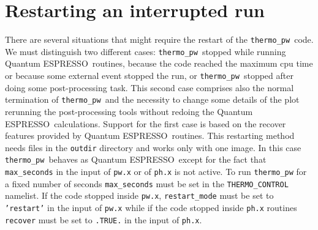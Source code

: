 \documentclass[12pt,a4paper]{article}
\def\qe{{\sc Quantum ESPRESSO}}
\def\thermo{\texttt{thermo\_pw}}
\begin{document}
%
%

\section{\color{coral}Restarting an interrupted run}

There are several situations that might require the restart of the \thermo\ 
code. We must distinguish two different cases:
\thermo\ stopped while running \qe\ routines, because the code reached
the maximum cpu time or because some external event stopped the run,
or \thermo\ stopped after doing some post-processing task. This second 
case comprises also the normal termination of
\thermo\ and the necessity to change some details of the plot rerunning
the post-processing tools without redoing the \qe\ calculations.
Support for the first case is based on the recover features provided by 
\qe\ routines. This restarting method needs files in the \texttt{outdir}
directory and works only with one image. In this case \thermo\ behaves as \qe\ 
except for the fact that \texttt{max\_seconds} in the input of \texttt{pw.x} or
of \texttt{ph.x} is not active. To run \texttt{thermo\_pw}
for a fixed number of seconds \texttt{max\_seconds} must be set in the
\texttt{THERMO\_CONTROL} namelist. If the code stopped inside \texttt{pw.x},
\texttt{restart\_mode} must be set to \texttt{'restart'} in the input of 
\texttt{pw.x} while if the code stopped inside \texttt{ph.x} routines
\texttt{recover} must be set to \texttt{.TRUE.} in the input of \texttt{ph.x}.
\end{document}

